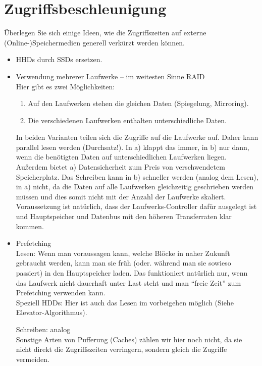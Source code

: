 \section{Zugriffsbeschleunigung}
Überlegen Sie sich einige Ideen, wie die Zugriffszeiten auf externe (Online-)Spei\-cher\-me\-di\-en generell verkürzt werden können.

\begin{solution}
	\begin{itemize}
		\item HHDs durch SSDs ersetzen.

		\item Verwendung mehrerer Laufwerke -- im weitesten Sinne RAID\\
		Hier gibt es zwei Möglichkeiten:
		\begin{enumerate}
			\item Auf den Laufwerken stehen die gleichen Daten (Spiegelung, Mirroring).
			\item Die verschiedenen Laufwerken enthalten unterschiedliche Daten.
		\end{enumerate}
		In beiden Varianten teilen sich die Zugriffe auf die Laufwerke auf. Daher kann parallel lesen werden (Durchsatz!).
		In a) klappt das immer, in b) nur dann, wenn die benötigten Daten auf unterschiedlichen Laufwerken liegen. Außerdem bietet a) Datensicherheit zum Preis von verschwendetem Speicherplatz.
		Das Schreiben kann in b) schneller werden (analog dem Lesen), in a) nicht, da die Daten auf alle Laufwerken gleichzeitig geschrieben werden müssen und dies somit nicht mit der Anzahl der Laufwerke skaliert.
		Voraussetzung ist natürlich, dass der Laufwerks-Controller dafür ausgelegt ist und Hauptspeicher und Datenbus mit den höheren Transferraten klar kommen.

		\item Prefetching\\
		Lesen: Wenn man voraussagen kann, welche Blöcke in naher Zukunft gebraucht werden, kann man sie früh (oder. während man sie sowieso passiert) in den Hauptspeicher laden.
		Das funktioniert natürlich nur, wenn das Laufwerk nicht dauerhaft unter Last steht und man 	"`freie Zeit"' zum Prefetching verwenden kann.\\
		Speziell HDDs: Hier ist auch das Lesen im vorbeigehen möglich (Siehe Elevator-Algorithmus).

		Schreiben: analog\\
		Sonstige Arten von Pufferung (Caches) zählen wir hier noch nicht, da sie nicht direkt die Zugriffszeiten verringern, sondern gleich die Zugriffe vermeiden.


\end{itemize}
\end{solution}
